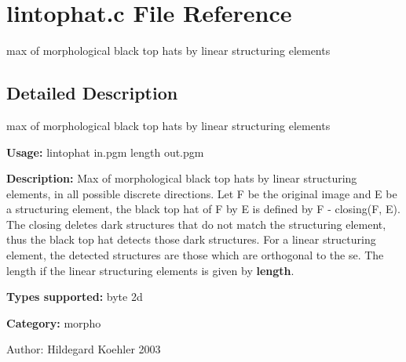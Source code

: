 \section{lintophat.c File Reference}
\label{lintophat_8c}
max of morphological black top hats by linear structuring elements 



\subsection{Detailed Description}
max of morphological black top hats by linear structuring elements 

{\bf Usage:} lintophat in.pgm length out.pgm

{\bf Description:} Max of morphological black top hats by linear structuring elements, in all possible discrete directions. Let F be the original image and E be a structuring element, the black top hat of F by E is defined by F - closing(F, E). The closing deletes dark structures that do not match the structuring element, thus the black top hat detects those dark structures. For a linear structuring element, the detected structures are those which are orthogonal to the se. The length if the linear structuring elements is given by {\bf length}.

{\bf Types supported:} byte 2d

{\bf Category:} morpho

\begin{Desc}
\item[Author:]Hildegard Koehler 2003 \end{Desc}
